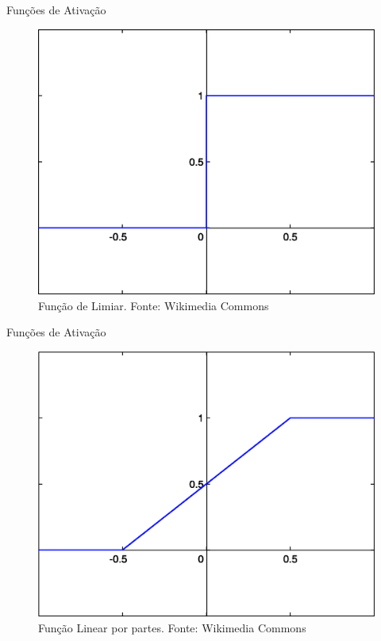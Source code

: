 \documentclass{beamer}
\begin{document}
      \begin{frame}{Funções de Ativação}
	\begin{figure}[htpb]
	  \includegraphics[scale=1.2]{limiar.png}
	  \caption{Função de Limiar. Fonte: Wikimedia Commons }
	\end{figure}
      \end{frame}

      \begin{frame}{Funções de Ativação}
	\begin{figure}[htpb]
	  \includegraphics[scale=0.4]{linearpartes.png}
	  \caption{Função Linear por partes. Fonte: Wikimedia Commons }
	\end{figure}
      \end{frame}
\end{document}
